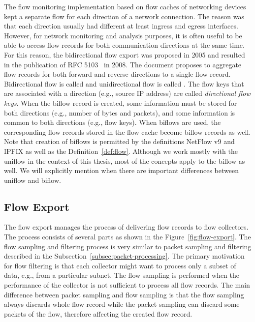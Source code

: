 The flow monitoring implementation based on flow caches of networking devices kept a separate flow for each direction of a network connection. The reason was that each direction usually had different at least ingress and egress interfaces. However, for network monitoring and analysis purposes, it is often useful to be able to access flow records for both communication directions at the same time. For this reason, the bidirectional flow export was proposed in 2005 and resulted in the publication of RFC 5103~\cite{rfc5103} in 2008. The document proposes to aggregate flow records for both forward and reverse directions to a single flow record. Bidirectional flow is called \emph{} and unidirectional flow is called \emph{}. The flow keys that are associated with a direction (e.g., source IP address) are called \emph{directional flow keys}. When the biflow record is created, some information must be stored for both directions (e.g., number of bytes and packets), and some information is common to both directions (e.g., flow keys). When biflows are used, the corresponding flow records stored in the flow cache become biflow records as well. Note that creation of biflows is permitted by the definitions NetFlow v9 and IPFIX as well as the Definition~\ref{def:flow}. Although we work mostly with the uniflow in the context of this thesis, most of the concepts apply to the biflow as well. We will explicitly mention when there are important differences between uniflow and biflow.

\subsection{Flow Export}

The flow export manages the process of delivering flow records to flow collectors. The process consists of several parts as shown in the Figure~\ref{fig:flow-export}. The flow sampling and filtering process is very similar to packet sampling and filtering described in the Subsection~\ref{subsec:packet-processing}. The primary motivation for flow filtering is that each collector might want to process only a subset of data, e.g., from a particular subnet. The flow sampling is performed when the performance of the collector is not sufficient to process all flow records. The main difference between packet sampling and flow sampling is that the flow sampling always discards whole flow record while the packet sampling can discard some packets of the flow, therefore affecting the created flow record. 

